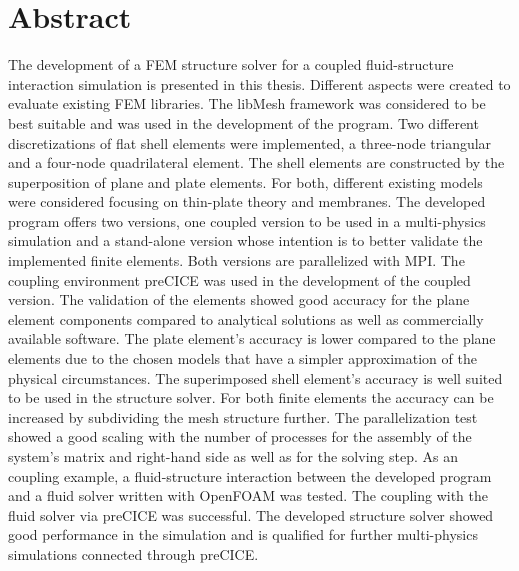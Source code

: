 \section*{Abstract}

The development of a FEM structure solver for a coupled fluid-structure interaction simulation is presented in this thesis. Different aspects were created to evaluate existing FEM libraries. The libMesh framework was considered to be best suitable and was used in the development of the program. Two different discretizations of flat shell elements were implemented, a three-node triangular and a four-node quadrilateral element. The shell elements are constructed by the superposition of plane and plate elements. For both, different existing models were considered focusing on thin-plate theory and membranes. The developed program offers two versions, one coupled version to be used in a multi-physics simulation and a stand-alone version whose intention is to better validate the implemented finite elements. Both versions are parallelized with MPI. The coupling environment preCICE was used in the development of the coupled version. The validation of the elements showed good accuracy for the plane element components compared to analytical solutions as well as commercially available software. The plate element's accuracy is lower compared to the plane elements due to the chosen models that have a simpler approximation of the physical circumstances. The superimposed shell element's accuracy is well suited to be used in the structure solver. For both finite elements the accuracy can be increased by subdividing the mesh structure further. The parallelization test showed a good scaling with the number of processes for the assembly of the system's matrix and right-hand side as well as for the solving step. As an coupling example, a fluid-structure interaction between the developed program and a fluid solver written with OpenFOAM was tested. The coupling with the fluid solver via preCICE was successful. The developed structure solver showed good performance in the simulation and is qualified for further multi-physics simulations connected through preCICE.
